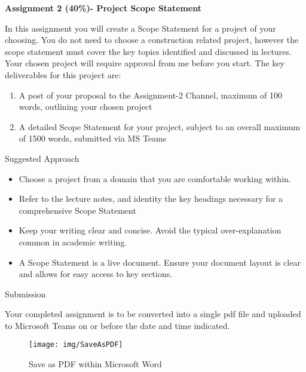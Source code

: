 

	
\begin{flushleft}
\Large\textbf{Assignment 2 (40\%)- Project Scope Statement}\\
\end{flushleft}

In this assignment you will create a Scope Statement for a project of your choosing.  You do not need to choose a construction related project, however the scope statement must cover the key topics identified and discussed in lectures.  Your chosen project will require approval from me before you start.  The key deliverables for this project are:

\begin{enumerate}
	\item A post of your proposal to the Assignment-2 Channel, maximum of 100 words, outlining your chosen project
	\item A detailed Scope Statement for your project, subject to an overall maximum of 1500 words, submitted via MS Teams
\end{enumerate}

\begin{large}
Suggested Approach
\end{large}


\begin{itemize}
	\item Choose a project from a domain that you are comfortable working within.  
	\item Refer to the lecture notes, and identity the key headings necessary for a comprehensive Scope Statement
	\item Keep your writing clear and concise.  Avoid the typical over-explanation common in academic writing.
	\item A Scope Statement is a live document.  Ensure your document layout is clear and allows for easy access to key sections. 

\end{itemize}

\begin{large}
Submission
\end{large}

Your completed assignment is to be converted into a single pdf file and uploaded to Microsoft Teams on or before the date and time indicated. 

\begin{figure}[th]
	\centering
	\texttt{[image: img/SaveAsPDF]}
	\caption[Save as PDF within Microsoft Word]{Save as PDF within Microsoft Word}
	\label{fig:saveaspdf}
\end{figure}




